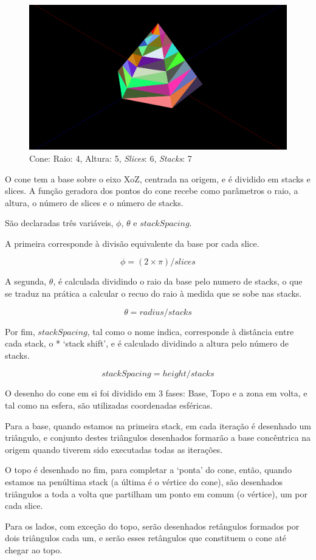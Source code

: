 \documentclass[a4paper]{article}
\begin{document}
\begin{figure}[H]
    \centering
    \includegraphics[width=0.5\linewidth]{cone.png}
    \caption{Cone: Raio: 4, Altura: 5, \textit{Slices}: 6, \textit{Stacks}: 7}
\end{figure}

O cone tem a base sobre o eixo XoZ, centrada na origem, e é dividido em stacks e slices. A função geradora dos pontos do cone recebe como parâmetros o raio, a altura, o número de slices e o número de stacks.

São declaradas três variáveis, $\phi$, $\theta$ e $stackSpacing$.

A primeira corresponde à divisão equivalente da base por cada slice.

\[\phi = (2 \times \pi) / slices\]

A segunda, $\theta$, é calculada dividindo o raio da base pelo numero de stacks, o que se traduz na prática a calcular o recuo do raio à medida que se sobe nas stacks.

\[\theta = radius / stacks\]

Por fim, $stackSpacing$, tal como o nome indica, corresponde à distância entre cada stack, o *  `stack shift', e é calculado dividindo a altura pelo número de stacks.


\[stackSpacing = height / stacks\]


O desenho do cone em si foi dividido em 3 fases: Base, Topo e a zona em volta, e tal como na esfera, são utilizadas coordenadas esféricas.

Para a base, quando estamos na primeira stack, em cada iteração é desenhado um triângulo, e conjunto destes triângulos desenhados formarão a base concêntrica na origem quando tiverem sido executadas todas as iterações.

O topo é desenhado no fim, para completar a `ponta' do cone, então, quando estamos na penúltima stack (a última é o vértice do cone), são desenhados triângulos a toda a volta que partilham um ponto em comum (o vértice), um por cada slice.

Para os lados, com exceção do topo, serão desenhados retângulos formados por dois triângulos cada um, e serão esses retângulos que constituem o cone até chegar ao topo.
\end{document}
